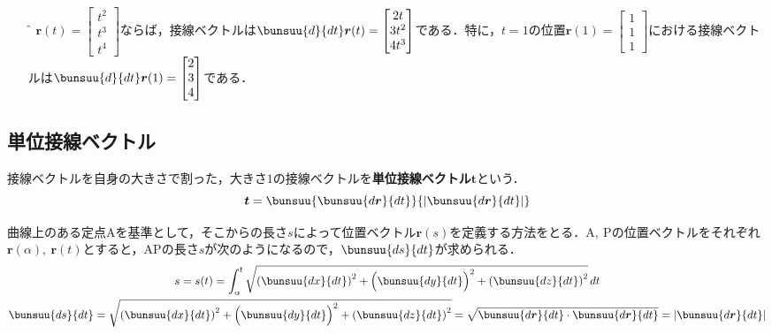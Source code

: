 \begin{enumerate}[leftmargin=18pt, labelsep=10pt, labelsep=10pt, itemindent=9pt]
	\item[\f{例}] $\bm{r}(t) =
		\begin{bmatrix}
			t^2\\ t^3\\ t^4
		\end{bmatrix}
		$ならば，接線ベクトルは$\bunsuu{d}{dt}\bm{r}(t) =
		\begin{bmatrix}
			2t\\ 3t^2\\ 4t^3
		\end{bmatrix}
		$である．特に，$t = 1$の位置$\bm{r}(1) =
		\begin{bmatrix}
			1\\ 1\\ 1
		\end{bmatrix}
		$における接線ベクトルは$\bunsuu{d}{dt}\bm{r}(1) =
		\begin{bmatrix}
			2\\ 3\\ 4
		\end{bmatrix}
		$である．
\end{enumerate}



\subsection{単位接線ベクトル}

接線ベクトルを自身の大きさで割った，大きさ$1$の接線ベクトルを\textbf{単位接線ベクトル}$\bm{t}$という．
\begin{equation}
	\bm{t} = \bunsuu{\bunsuu{d\bm{r}}{dt}}{\left|\bunsuu{d\bm{r}}{dt}\right|} \label{equ2-16}
\end{equation}

曲線上のある定点$\mathrm{A}$を基準として，そこからの長さ$s$によって位置ベクトル$\bm{r}(s)$を定義する方法をとる．$\mathrm{A,\ P}$の位置ベクトルをそれぞれ$\bm{r}(\alpha),\ \bm{r}(t)$とすると，$\mathrm{AP}$の長さ$s$が次のようになるので，$\bunsuu{ds}{dt}$が求められる．
\begin{gather}
	s = s(t) = \int_{\alpha}^{t} \sqrt{\left(\bunsuu{dx}{dt}\right)^2 + \Bigl(\bunsuu{dy}{dt}\Bigr)^2 + \left(\bunsuu{dz}{dt}\right)^2}\,dt\\
	\bunsuu{ds}{dt} = \sqrt{\left(\bunsuu{dx}{dt}\right)^2 + \Bigl(\bunsuu{dy}{dt}\Bigr)^2 + \left(\bunsuu{dz}{dt}\right)^2} = \sqrt{\bunsuu{d\bm{r}}{dt} \cdot \bunsuu{d\bm{r}}{dt}} = \left|\bunsuu{d\bm{r}}{dt}\right|
\end{gather}

